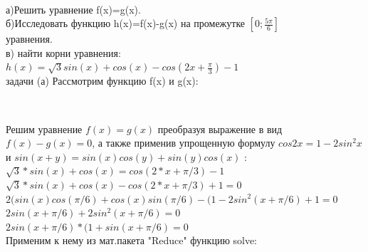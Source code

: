 \documentclass[russian,utf8,nocolumnxxxi,nocolumnxxxii]{eskdtext}
\begin{document}
\\а)Решить уравнение f(x)=g(x).
\\б)Исследовать функцию h(x)=f(x)-g(x) на промежутке $[0;\frac{5\pi}{6}]$\\
{ уравнения.}\\
в) найти корни уравнения:\\
$h(x)=\sqrt{3}sin(x)+cos(x)-cos(2x+\frac{\pi}{3})-1$\\
\newpage
{ задачи (а)}
Рассмотрим функцию f(x) и g(x):\\

\begin{figure}[H]
\begin{center}
\begin{minipage}[h]{0.65\linewidth}
  \\
\end{minipage}
\end{center}
\end{figure}

Решим уравнение $f(x)=g(x)$ преобразуя выражение в вид $f(x)-g(x)=0$, а также применив упрощенную формулу $cos2x=1-2sin^2x$ и $sin(x+y)=sin(x)cos(y)+sin(y)cos(x)$ :\\

$\sqrt{3}*sin(x)+cos(x)=cos(2*x+\pi/3)-1$\\
$\sqrt{3}*sin(x)+cos(x)-cos(2*x+\pi/3)+1=0$\\
$2(sin(x)cos(\pi/6)+cos(x)sin(\pi/6)-(1-2sin^2(x+\pi/6)+1=0$\\
$2sin(x+\pi/6)+2sin^2(x+\pi/6)=0$\\
$2sin(x+\pi/6)*(1+sin(x+\pi/6)=0$\\

Применим к нему из мат.пакета "Reduce" функцию solve: \\
\end{document}
